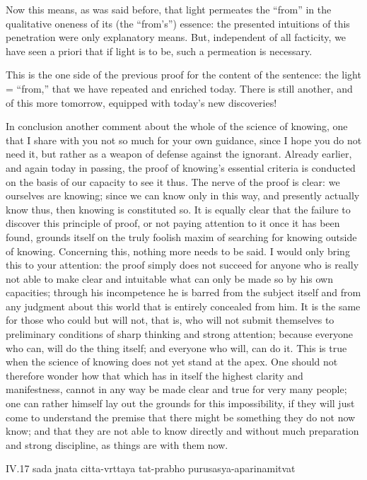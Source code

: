 Now this means, as was said before,
that light permeates the “from”
in the qualitative oneness of its (the “from's”) essence:
the presented intuitions of this penetration
were only explanatory means.
But, independent of all facticity,
we have seen a priori
that if light is to be,
such a permeation is necessary.

This is the one side of the previous proof
for the content of the sentence:
the light = “from,”
that we have repeated and enriched today.
There is still another,
and of this more tomorrow,
equipped with today's new discoveries!

In conclusion another comment about
the whole of the science of knowing,
one that I share with you not so much for your own guidance,
since I hope you do not need it,
but rather as a weapon of defense against the ignorant.
Already earlier, and again today in passing,
the proof of knowing's essential criteria is conducted
on the basis of our capacity to see it thus.
The nerve of the proof is clear:
we ourselves are knowing;
since we can know only in this way,
and presently actually know thus,
then knowing is constituted so.
It is equally clear that the failure
to discover this principle of proof,
or not paying attention to it once it has been found,
grounds itself on the truly foolish maxim
of searching for knowing outside of knowing.
Concerning this, nothing more needs to be said.
I would only bring this to your attention:
the proof simply does not succeed for anyone
who is really not able to make clear and intuitable
what can only be made so by his own capacities;
through his incompetence he is
barred from the subject itself
and from any judgment about this world
that is entirely concealed from him.
It is the same for those who could but will not, that is,
who will not submit themselves to preliminary conditions
of sharp thinking and strong attention;
because everyone who can, will do the thing itself;
and everyone who will, can do it.
This is true when the science of knowing
does not yet stand at the apex.
One should not therefore wonder
how that which has in itself
the highest clarity and manifestness,
cannot in any way be made clear and true
for very many people;
one can rather himself lay out
the grounds for this impossibility,
if they will just come to understand the premise
that there might be something they do not now know;
and that they are not able to know directly
and without much preparation and strong discipline,
as things are with them now.

IV.17
sada jnata citta-vrttaya tat-prabho purusasya-aparinamitvat

